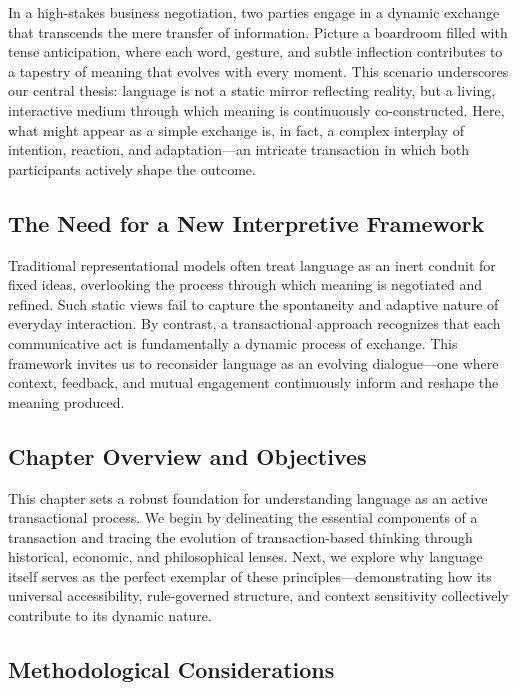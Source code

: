 \documentclass[12pt]{article}
\begin{document}
In a high-stakes business negotiation, two parties engage in a dynamic exchange that transcends the mere transfer of information. Picture a boardroom filled with tense anticipation, where each word, gesture, and subtle inflection contributes to a tapestry of meaning that evolves with every moment. This scenario underscores our central thesis: language is not a static mirror reflecting reality, but a living, interactive medium through which meaning is continuously co-constructed. Here, what might appear as a simple exchange is, in fact, a complex interplay of intention, reaction, and adaptation---an intricate transaction in which both participants actively shape the outcome.

\subsection{The Need for a New Interpretive Framework}

Traditional representational models often treat language as an inert conduit for fixed ideas, overlooking the process through which meaning is negotiated and refined. Such static views fail to capture the spontaneity and adaptive nature of everyday interaction. By contrast, a transactional approach recognizes that each communicative act is fundamentally a dynamic process of exchange. This framework invites us to reconsider language as an evolving dialogue---one where context, feedback, and mutual engagement continuously inform and reshape the meaning produced.

\subsection{Chapter Overview and Objectives}

This chapter sets a robust foundation for understanding language as an active transactional process. We begin by delineating the essential components of a transaction and tracing the evolution of transaction-based thinking through historical, economic, and philosophical lenses. Next, we explore why language itself serves as the perfect exemplar of these principles---demonstrating how its universal accessibility, rule-governed structure, and context sensitivity collectively contribute to its dynamic nature.

\subsection{Methodological Considerations}
\end{document}
